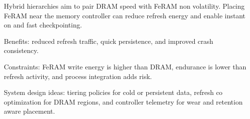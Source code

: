 Hybrid hierarchies aim to pair DRAM speed with FeRAM non volatility. Placing FeRAM near the memory controller can reduce refresh energy and enable instant on and fast checkpointing.

Benefits: reduced refresh traffic, quick persistence, and improved crash consistency.

Constraints: FeRAM write energy is higher than DRAM, endurance is lower than refresh activity, and process integration adds risk.

System design ideas: tiering policies for cold or persistent data, refresh co optimization for DRAM regions, and controller telemetry for wear and retention aware placement.
